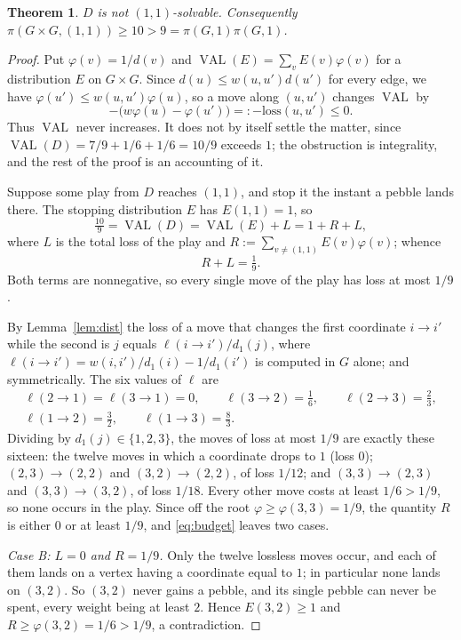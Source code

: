 \documentclass[11pt]{amsart}
\newtheorem{theorem}{Theorem}
\theoremstyle{definition}
\DeclareMathOperator{\VAL}{VAL}
\begin{document}
\begin{theorem}\label{thm:main}
$D$ is not $(1,1)$-solvable. Consequently
$\pi(G\times G,(1,1))\ge10>9=\pi(G,1)\pi(G,1)$.
\end{theorem}

\begin{proof}
Put $\varphi(v)=1/d(v)$ and $\VAL(E)=\sum_vE(v)\varphi(v)$ for a
distribution $E$ on $G\times G$. Since $d(u)\le w(u,u')d(u')$ for every edge,
we have $\varphi(u')\le w(u,u')\varphi(u)$, so a move along $(u,u')$ changes
$\VAL$ by
\[
  -\bigl(w\varphi(u)-\varphi(u')\bigr)=:-\mathrm{loss}(u,u')\le0 .
\]
Thus $\VAL$ never increases. It does not by itself settle the matter, since
$\VAL(D)=7/9+1/6+1/6=10/9$ exceeds $1$; the obstruction is integrality, and
the rest of the proof is an accounting of it.

Suppose some play from $D$ reaches $(1,1)$, and stop it the instant a pebble
lands there. The stopping distribution $E$ has $E(1,1)=1$, so
\[
  \tfrac{10}{9}=\VAL(D)=\VAL(E)+L=1+R+L,
\]
where $L$ is the total loss of the play and
$R:=\sum_{v\neq(1,1)}E(v)\varphi(v)$; whence
\begin{equation}\label{eq:budget}
  R+L=\tfrac19 .
\end{equation}
Both terms are nonnegative, so every single move of the play has loss at most
$1/9$.

By Lemma~\ref{lem:dist} the loss of a move that changes the first coordinate
$i\to i'$ while the second is $j$ equals $\ell(i\to i')/d_1(j)$, where
$\ell(i\to i')=w(i,i')/d_1(i)-1/d_1(i')$ is computed in $G$ alone; and
symmetrically. The six values of $\ell$ are
\begin{gather*}
  \ell(2\to1)=\ell(3\to1)=0,\qquad \ell(3\to2)=\tfrac16,\qquad
  \ell(2\to3)=\tfrac23,\\
  \ell(1\to2)=\tfrac32,\qquad \ell(1\to3)=\tfrac83 .
\end{gather*}
Dividing by $d_1(j)\in\{1,2,3\}$, the moves of loss at most $1/9$ are exactly
these sixteen: the twelve moves in which a coordinate drops to $1$ (loss $0$);
$(2,3)\to(2,2)$ and $(3,2)\to(2,2)$, of loss $1/12$; and $(3,3)\to(2,3)$ and
$(3,3)\to(3,2)$, of loss $1/18$. Every other move costs at least
$1/6>1/9$, so none occurs in the play. Since off the root
$\varphi\ge\varphi(3,3)=1/9$, the quantity $R$ is either $0$ or at least
$1/9$, and \eqref{eq:budget} leaves two cases.

\emph{Case B: $L=0$ and $R=1/9$.} Only the twelve lossless moves occur, and
each of them lands on a vertex having a coordinate equal to $1$; in
particular none lands on $(3,2)$. So $(3,2)$ never gains a pebble, and its
single pebble can never be spent, every weight being at least $2$. Hence
$E(3,2)\ge1$ and $R\ge\varphi(3,2)=1/6>1/9$, a contradiction.


\end{proof}
\end{document}
